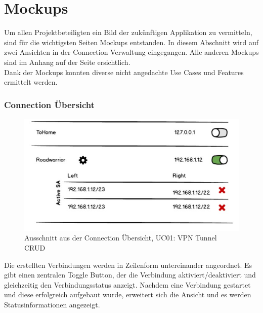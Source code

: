 \section{Mockups}
Um allen Projektbeteiligten ein Bild der zukünftigen Applikation zu vermitteln, sind für die wichtigsten Seiten Mockups entstanden. In diesem Abschnitt wird auf zwei Ansichten in der Connection Verwaltung eingegangen. Alle anderen Mockups sind im Anhang auf der Seite \pageref{Mockups} ersichtlich.\\
Dank der Mockups konnten  diverse nicht angedachte Use Cases und Features ermittelt werden.
\subsubsection{Connection Übersicht}
\begin{figure}[H]
	\centering
	\includegraphics[width=330pt]{images/mockups/short_con_overview.jpg}
	\caption{Ausschnitt aus der Connection Übersicht,  UC01: VPN Tunnel CRUD}
\end{figure}
\medskip
Die erstellten Verbindungen werden in Zeilenform untereinander angeordnet. Es gibt einen zentralen Toggle Button, der die Verbindung aktiviert/deaktiviert und gleichzeitig den Verbindungsstatus anzeigt. 
Nachdem eine Verbindung gestartet und diese erfolgreich aufgebaut wurde, erweitert sich die Ansicht und es werden Statusinformationen angezeigt.
    
